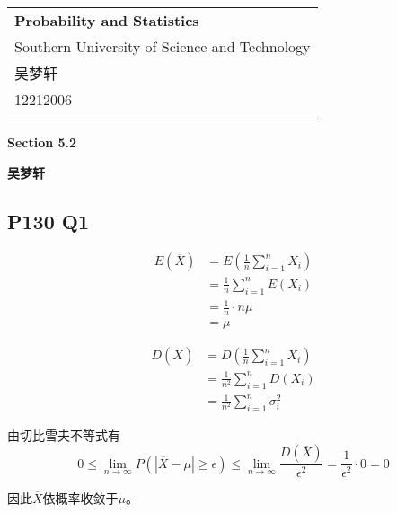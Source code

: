 \documentclass[a4paper,12pt]{ctexart}
\begin{document}
\thispagestyle{empty} %

\begin{tabular}{p{15.5cm}}
{\large \bf Probability and Statistics} \\
Southern University of Science and Technology \\ 吴梦轩 \\ 12212006 \\
\hline
\\
\end{tabular}

\vspace*{0.3cm} %

\begin{center}
	{\Large \bf Section 5.2}
	\vspace{2mm}

	{\bf 吴梦轩}
		
\end{center}  

\vspace{0.4cm}

\subsection*{P130 Q1}

\begin{align*}
	E(\overline{X}) &= E\left(\frac{1}{n}\sum_{i=1}^{n}X_i\right) \\
	&= \frac{1}{n}\sum_{i=1}^{n}E(X_i) \\
	&= \frac{1}{n} \cdot n \mu \\
	&= \mu
\end{align*}

\begin{align*}
	D(\overline{X}) &= D\left(\frac{1}{n}\sum_{i=1}^{n}X_i\right) \\
	&= \frac{1}{n^2} \sum_{i=1}^{n}D(X_i) \\
	&= \frac{1}{n^2} \sum_{i=1}^{n} \sigma_i^2 
\end{align*}

由切比雪夫不等式有
\begin{equation*}
	0 \leq \lim_{n \rightarrow \infty} P(|\overline{X} - \mu| \geq \epsilon) \leq \lim_{n \rightarrow \infty} \frac{D(\overline{X})}{\epsilon^2} = \frac{1}{\epsilon^2} \cdot 0 = 0
\end{equation*}

因此$\overline{X}$依概率收敛于$\mu$。
\end{document}
